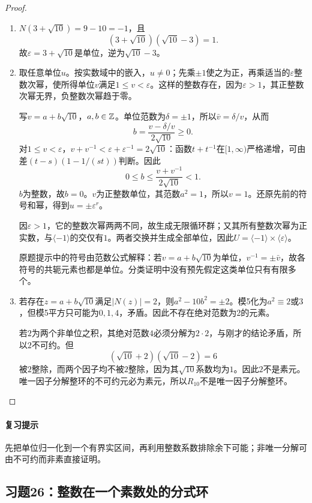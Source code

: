 \begin{proof}

\begin{enumerate}[label=(\roman*)]
\item $N(3+\sqrt{10})=9-10=-1$，且
\[
(3+\sqrt{10})(\sqrt{10}-3)=1.
\]
故$\varepsilon=3+\sqrt{10}$是单位，逆为$\sqrt{10}-3$。
\item 取任意单位$u$。按实数域中的嵌入，$u\ne0$；先乘$\pm1$使之为正，再乘适当的$\varepsilon$整数次幂，使所得单位$v$满足$1\le v<\varepsilon$。这样的整数存在，因为$\varepsilon>1$，其正整数次幂无界，负整数次幂趋于零。

写$v=a+b\sqrt{10}$，$a,b\in\mathbb Z$。单位范数为$\delta=\pm1$，所以$\bar v=\delta/v$，从而
\[
b=\frac{v-\delta/v}{2\sqrt{10}}\ge0.
\]
对$1\le v<\varepsilon$，$v+v^{-1}<\varepsilon+\varepsilon^{-1}=2\sqrt{10}$：函数$t+t^{-1}$在$[1,\infty)$严格递增，可由差$(t-s)(1-1/(st))$判断。因此
\[
0\le b\le\frac{v+v^{-1}}{2\sqrt{10}}<1.
\]
$b$为整数，故$b=0$。$v$为正整数单位，其范数$a^2=1$，所以$v=1$。还原先前的符号和幂，得到$u=\pm\varepsilon^r$。

因$\varepsilon>1$，它的整数次幂两两不同，故生成无限循环群；又其所有整数次幂为正实数，与$\langle-1\rangle$的交仅有$1$。两者交换并生成全部单位，因此$U=\langle-1\rangle\times\langle\varepsilon\rangle$。

原题提示中的符号由范数公式解释：若$v=a+b\sqrt{10}$为单位，$v^{-1}=\pm\bar v$，故各符号的共轭元素也都是单位。分类证明中没有预先假定这类单位只有有限多个。
\item 若存在$z=a+b\sqrt{10}$满足$|N(z)|=2$，则$a^2-10b^2=\pm2$。模5化为$a^2\equiv2$或$3$，但模5平方只可能为$0,1,4$，矛盾。因此不存在绝对范数为2的元素。

若$2$为两个非单位之积，其绝对范数$4$必须分解为$2\cdot2$，与刚才的结论矛盾，所以$2$不可约。但
\[
(\sqrt{10}+2)(\sqrt{10}-2)=6
\]
被$2$整除，而两个因子均不被$2$整除，因为其$\sqrt{10}$系数均为$1$。因此$2$不是素元。唯一因子分解整环的不可约元必为素元，所以$R_{10}$不是唯一因子分解整环。
\end{enumerate}

\end{proof}

\paragraph{复习提示}

先把单位归一化到一个有界实区间，再利用整数系数排除余下可能；非唯一分解可由不可约而非素直接证明。

\subsection{习题26：整数在一个素数处的分式环}

